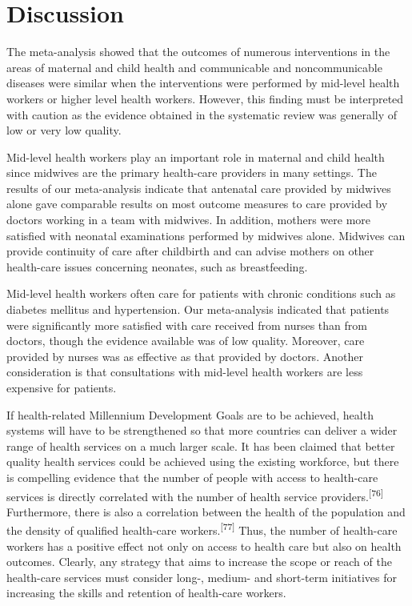 \documentclass{article}
\begin{document}
\section{Discussion}

The meta-analysis showed that the outcomes of numerous interventions in the
areas of maternal and
child health and communicable and noncommunicable diseases were similar when the
interventions were
performed by mid-level health workers or higher level health workers. However,
this finding must be
interpreted with caution as the evidence obtained in the systematic review was
generally of low or
very low quality.

Mid-level health workers play an important role in maternal and child health
since midwives are
the primary health-care providers in many settings. The results of our
meta-analysis indicate that
antenatal care provided by midwives alone gave comparable results on most
outcome measures to care
provided by doctors working in a team with midwives. In addition, mothers were
more satisfied with
neonatal examinations performed by midwives alone. Midwives can provide
continuity of care after
childbirth and can advise mothers on other health-care issues concerning
neonates, such as
breastfeeding.

Mid-level health workers often care for patients with chronic conditions such as
diabetes
mellitus and hypertension. Our meta-analysis indicated that patients were
significantly more
satisfied with care received from nurses than from doctors, though the evidence
available was of low
quality. Moreover, care provided by nurses was as effective as that provided by
doctors. Another
consideration is that consultations with mid-level health workers are less
expensive for
patients.

If health-related Millennium Development Goals are to be achieved, health
systems will have to be
strengthened so that more countries can deliver a wider range of health services
on a much larger
scale. It has been claimed that better quality health services could be achieved
using the existing
workforce, but there is compelling evidence that the number of people with
access to health-care
services is directly correlated with the number of health service
providers.\textsuperscript{[}\textsuperscript{76}\textsuperscript{]}
Furthermore, there is also a correlation between the health of the
population and the density of qualified health-care
workers.\textsuperscript{[}\textsuperscript{77}\textsuperscript{]}
Thus, the number of health-care workers has a positive effect not only on
access to health care but also on health outcomes. Clearly, any strategy that
aims to increase the
scope or reach of the health-care services must consider long-, medium- and
short-term initiatives
for increasing the skills and retention of health-care workers.
\end{document}
